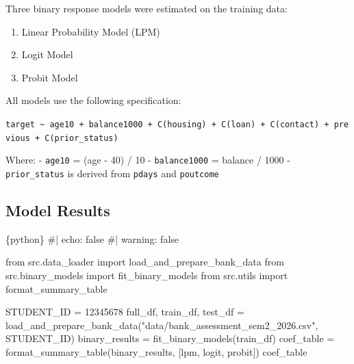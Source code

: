 \documentclass[
  letterpaper,
  DIV=11,
  numbers=noendperiod]{scrartcl}
\newenvironment{Shaded}{\begin{snugshade}}{\end{snugshade}}
\newcommand{\CommentTok}[1]{\textcolor[rgb]{0.37,0.37,0.37}{#1}}
\newcommand{\DecValTok}[1]{\textcolor[rgb]{0.68,0.00,0.00}{#1}}
\newcommand{\ImportTok}[1]{\textcolor[rgb]{0.00,0.46,0.62}{#1}}
\newcommand{\InformationTok}[1]{\textcolor[rgb]{0.37,0.37,0.37}{#1}}
\newcommand{\NormalTok}[1]{\textcolor[rgb]{0.00,0.23,0.31}{#1}}
\newcommand{\OperatorTok}[1]{\textcolor[rgb]{0.37,0.37,0.37}{#1}}
\newcommand{\StringTok}[1]{\textcolor[rgb]{0.13,0.47,0.30}{#1}}
\providecommand{\tightlist}{%
  \setlength{\itemsep}{0pt}\setlength{\parskip}{0pt}}
\begin{document}
Three binary response models were estimated on the training data:

\begin{enumerate}
\def\labelenumi{\arabic{enumi}.}
\tightlist
\item
  Linear Probability Model (LPM)
\item
  Logit Model
\item
  Probit Model
\end{enumerate}

All models use the following specification:

\texttt{target\ \textasciitilde{}\ age10\ +\ balance1000\ +\ C(housing)\ +\ C(loan)\ +\ C(contact)\ +\ previous\ +\ C(prior\_status)}

Where: - \texttt{age10} = (age - 40) / 10 - \texttt{balance1000} =
balance / 1000 - \texttt{prior\_status} is derived from \texttt{pdays}
and \texttt{poutcome}

\subsection{Model Results}\label{model-results}

\begin{Shaded}
\begin{Highlighting}[]
\InformationTok{\textasciigrave{}\textasciigrave{}\textasciigrave{}\{python\}}
\CommentTok{\#| echo: false}
\CommentTok{\#| warning: false}

\ImportTok{from}\NormalTok{ src.data\_loader }\ImportTok{import}\NormalTok{ load\_and\_prepare\_bank\_data}
\ImportTok{from}\NormalTok{ src.binary\_models }\ImportTok{import}\NormalTok{ fit\_binary\_models}
\ImportTok{from}\NormalTok{ src.utils }\ImportTok{import}\NormalTok{ format\_summary\_table}

\NormalTok{STUDENT\_ID }\OperatorTok{=} \DecValTok{12345678}
\NormalTok{full\_df, train\_df, test\_df }\OperatorTok{=}\NormalTok{ load\_and\_prepare\_bank\_data(}\StringTok{"data/bank\_assessment\_sem2\_2026.csv"}\NormalTok{, STUDENT\_ID)}
\NormalTok{binary\_results }\OperatorTok{=}\NormalTok{ fit\_binary\_models(train\_df)}
\NormalTok{coef\_table }\OperatorTok{=}\NormalTok{ format\_summary\_table(binary\_results, [}\StringTok{\textquotesingle{}lpm\textquotesingle{}}\NormalTok{, }\StringTok{\textquotesingle{}logit\textquotesingle{}}\NormalTok{, }\StringTok{\textquotesingle{}probit\textquotesingle{}}\NormalTok{])}
\NormalTok{coef\_table}
\InformationTok{\textasciigrave{}\textasciigrave{}\textasciigrave{}}
\end{Highlighting}
\end{Shaded}
\end{document}

